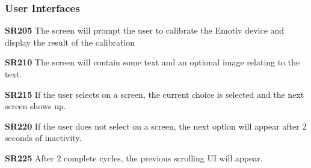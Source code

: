 \documentclass{article}
\begin{document}
\subsubsection{User Interfaces}
\textbf{SR205} The screen will prompt the user to calibrate the Emotiv device and display the result of the calibration

\textbf{SR210} The screen will contain some text and an optional image relating to the text.

\textbf{SR215} If the user selects on a screen, the current choice is selected and the next screen shows up. 

\textbf{SR220} If the user does not select on a screen, the next option will appear after 2 seconds of inactivity. 

\textbf{SR225} After 2 complete cycles, the previous scrolling UI will appear.




\end{document}

